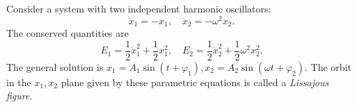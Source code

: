 Consider a system with two independent harmonic oscillators:
$$\ddot{x}_1 = -x_1, \quad \ddot{x}_2 = -\omega^2 x_2.$$
The conserved quantities are
$$E_1 = \frac{1}{2}\dot{x}_1^2 + \frac{1}{2}x_1^2, \quad E_2 = \frac{1}{2}\dot{x}_2^2 + \frac{1}{2}\omega^2 x_2^2.$$
The general solution is $x_1 = A_1 \sin(t + \varphi_1), x_2 = A_2 \sin(\omega t + \varphi_2)$.
The orbit in the $x_1, x_2$ plane given by these parametric equations is called a \textit{Lissajous figure}.
